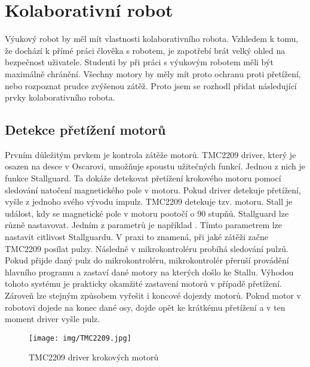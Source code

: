 \chapter{Kolaborativní robot}
Výukový robot by měl mít vlastnosti kolaborativního robota. Vzhledem k tomu, že dochází k přímé práci člověka s robotem, je zapotřebí brát velký ohled na bezpečnost uživatele. Studenti by při práci s výukovým robotem měli být maximálně chránění. Všechny motory by měly mít proto ochranu proti přetížení, nebo rozpoznat prudce zvýšenou zátěž. Proto jsem se rozhodl přidat následu\-jí\-cí prvky kolaborativního robota. \cite{Websy}
\section{Detekce přetížení motorů}Prvním důležitým prvkem je kontrola zátěže motorů. TMC2209 driver, který je osazen na desce v Oscarovi, umožňuje spoustu užitečných funkcí. Jednou z nich je funkce Stallguard. Ta dokáže detekovat přetížení krokového motoru pomocí sledování natočení magnetického pole v motoru. Pokud driver detekuje přetížení, vyšle z jednoho svého vývodu impulz. TMC2209 detekuje tzv.  motoru. Stall je událost, kdy se magnetické pole v motoru pootočí o 90 stupňů. Stallguard lze různě nastavovat. Jedním z parametrů je například . Tímto parametrem lze nastavit citlivost Stallguardu. V praxi to znamená, při jaké zátěži začne TMC2209 posílat pulzy. Následně v mikrokontroléru probíhá sledování pulzů. Pokud přijde daný pulz do mikrokontroléru, mikrokontrolér přeruší provádění hlavního programu a zastaví dané motory na kterých došlo ke Stallu. Výhodou tohoto systému je prakticky okamžité zastavení motorů v případě přetížení. Zároveň lze stejným způsobem vyřešit i koncové dojezdy motorů. Pokud motor v robotovi dojede na konec dané osy, dojde opět ke krátkému přetížení a v ten moment driver vyšle pulz. \cite{TMC2209} \cite{BIGTREETECH-TMC2209}

\begin{figure}
		\begin{center}
			\texttt{[image: img/TMC2209.jpg]}
			\caption{TMC2209 driver krokových motorů \cite{BIGTREETECH-TMC2209}}
			\label{fig:TMC2209}
		\end{center}
		\vspace{0mm}
\end{figure}

